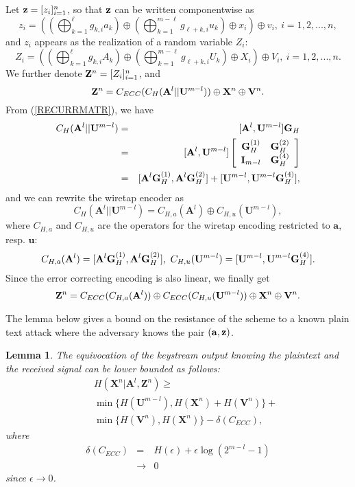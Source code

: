 \documentclass{article}[11pt]
\newcommand{\av}{\mathbf{a}}
\newcommand{\uv}{\mathbf{u}}
\newcommand{\am}{\mathbf{A}}
\newcommand{\um}{\mathbf{U}}
\newcommand{\vm}{\mathbf{V}}
\newcommand{\xm}{\mathbf{X}}
\newcommand{\zm}{\mathbf{Z}}
\newtheorem{lemma}{Lemma}
\begin{document}
Let ${\bf z} = [z_i]_{i=1}^n$, so that ${\bf z}$ can be written componentwise as
\[
z_i=((\bigoplus_{k=1}^{\ell} g_{k,i} a_k )\oplus
(\bigoplus_{k=1}^{m-\ell} g_{\ell+k,i} u_k ) \oplus x_i )\oplus v_i,~i=1,2,...,n,
\]
and $z_i$ appears as the realization of a random variable $Z_i$:
\[
Z_i = (( \bigoplus_{k=1}^{\ell} g_{k,i} A_k ) \oplus
(\bigoplus_{k=1}^{m-\ell} g_{\ell+k,i} U_k ) \oplus X_i )\oplus V_i,~ i=1,2,...,n.
\]
We further denote ${\bf Z}^n = [Z_i]_{i=1}^n$, and
\begin{equation}\label{eq:Z}
{\bf Z}^n = C_{ECC}(C_H({\bf A}^l||{\bf U}^{m-l}))\oplus{\bf X}^n
\oplus{\bf V}^n.
\end{equation}
From (\ref{RECURRMATR}), we have
\begin{eqnarray*}
C_H(\am^l||\um^{m-l})
&=&[\am^l,\um^{m-l}]{\bf G}_H\\
&=&[\am^l,\um^{m-l}]
\left[
\begin{array}{cc}
{\bf G}_H^{(1)} & {\bf G}_H^{(2)} \\
{\bf I}_{m-l} & {\bf G}_H^{(4)}
\end{array}
\right]\\
&=&
[\am^l{\bf G}_H^{(1)}, \am^l{\bf G}_H^{(2)}]+
[\um^{m-l},\um^{m-l}{\bf G}_H^{(4)}],
\end{eqnarray*}
and we can rewrite the wiretap encoder as
\[
C_H(\am^l||\um^{m-l})=C_{H,a}(\am^l)\oplus C_{H,u}(\um^{m-l}),
\]
where $C_{H,a}$ and $C_{H,u}$ are the operators for the wiretap encoding
restricted to $\av$, resp. $\uv$:
\[
C_{H,a}(\am^l)=[\am^l{\bf G}_H^{(1)}, \am^l{\bf G}_H^{(2)}],~
C_{H,u}(\um^{m-l})=[\um^{m-l},\um^{m-l}{\bf G}_H^{(4)}].
\]
Since the error correcting encoding is also linear, we finally get
\begin{equation}\label{eq:Z2}
{\bf Z}^n = C_{ECC}(C_{H,a}({\bf A}^l))\oplus C_{ECC}(C_{H,u}({\bf U}^{m-l}))
\oplus{\bf X}^n \oplus {\bf V}^n.
\end{equation}

The lemma below gives a bound on the resistance of the scheme to a known
plain text attack where the adversary knows the pair $({\bf a},{\bf z})$.
\begin{lemma}\label{lem:bound}
The equivocation of the keystream output knowing the plaintext and
the received signal can be lower bounded as follows:
\begin{eqnarray*}
&& H(\xm^n|\am^l,\zm^n)\geq \\
& & \min\{H(\um^{m-l}), H(\xm^n)+H(\vm^n)\} +\\
& & \min\{H(\vm^n),H(\xm^n) \}- \delta(C_{ECC}),
\end{eqnarray*}
where
\begin{eqnarray*}
\delta(C_{ECC}) & = & H(\epsilon)+\epsilon \log(2^{m-l}-1) \\
                &\rightarrow & 0
\end{eqnarray*}
since $\epsilon\rightarrow 0$.
\end{lemma}
\end{document}
